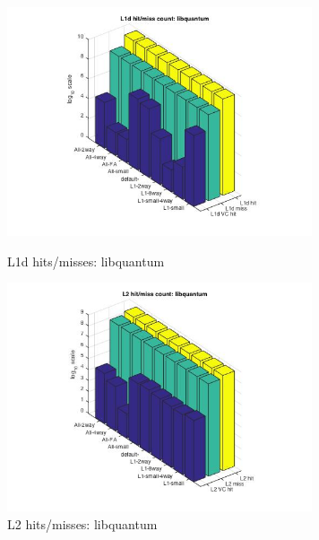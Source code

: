 \documentclass[11pt,titlepage]{article}
\begin{document}
          \begin{figure}[H]
          \centering
          \begin{minipage}{.45\textwidth}
               \includegraphics[width=9cm]{L1DHM_libquantum}
               \caption{L1d hits/misses: libquantum}
               \label{fig:L1DHM_libquantum}
          \end{minipage}
          \begin{minipage}{.45\textwidth}
               \includegraphics[width=9cm]{L2HM_libquantum}
               \caption{L2 hits/misses: libquantum}
               \label{fig:L2HM_libquantum}
          \end{minipage}
        \end{figure}
\end{document}
